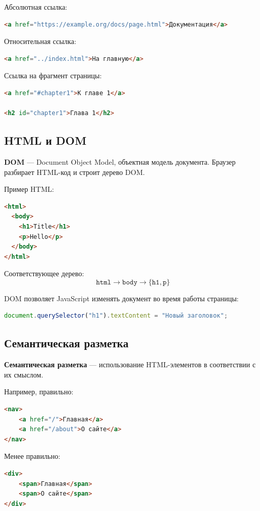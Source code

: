 \documentclass[12pt,a4paper]{article}
\begin{document}
Абсолютная ссылка:
\begin{lstlisting}[language=HTML]
<a href="https://example.org/docs/page.html">Документация</a>
\end{lstlisting}

Относительная ссылка:
\begin{lstlisting}[language=HTML]
<a href="../index.html">На главную</a>
\end{lstlisting}

Ссылка на фрагмент страницы:
\begin{lstlisting}[language=HTML]
<a href="#chapter1">К главе 1</a>

<h2 id="chapter1">Глава 1</h2>
\end{lstlisting}

\subsection{HTML и DOM}

\textbf{DOM} --- Document Object Model, объектная модель документа. Браузер разбирает HTML-код и строит дерево DOM.

Пример HTML:
\begin{lstlisting}[language=HTML]
<html>
  <body>
    <h1>Title</h1>
    <p>Hello</p>
  </body>
</html>
\end{lstlisting}

Соответствующее дерево:
\[
\texttt{html}
\rightarrow
\texttt{body}
\rightarrow
\{\texttt{h1}, \texttt{p}\}
\]

DOM позволяет JavaScript изменять документ во время работы страницы:
\begin{lstlisting}[language=JavaScript]
document.querySelector("h1").textContent = "Новый заголовок";
\end{lstlisting}

\subsection{Семантическая разметка}

\textbf{Семантическая разметка} --- использование HTML-элементов в соответствии с их смыслом.

Например, правильно:
\begin{lstlisting}[language=HTML]
<nav>
    <a href="/">Главная</a>
    <a href="/about">О сайте</a>
</nav>
\end{lstlisting}

Менее правильно:
\begin{lstlisting}[language=HTML]
<div>
    <span>Главная</span>
    <span>О сайте</span>
</div>
\end{lstlisting}
\end{document}
